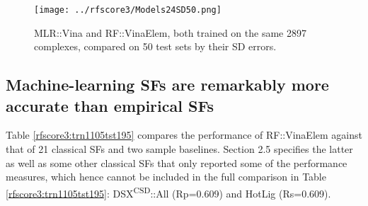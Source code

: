 \begin{figure}
\centering
\texttt{[image: ../rfscore3/Models24SD50.png]}
\caption{MLR::Vina and RF::VinaElem, both trained on the same 2897 complexes, compared on 50 test sets by their SD errors.}
\label{rfscore3:Models24SD50}
\end{figure}

\subsection{Machine-learning SFs are remarkably more accurate than empirical SFs}

Table \ref{rfscore3:trn1105tst195} compares the performance of RF::VinaElem against that of 21 classical SFs and two sample baselines. Section 2.5 specifies the latter as well as some other classical SFs that only reported some of the performance measures, which hence cannot be included in the full comparison in Table \ref{rfscore3:trn1105tst195}: DSX\textsuperscript{CSD}::All \citep{1460} (Rp=0.609) and HotLig \citep{1459} (Rs=0.609).

